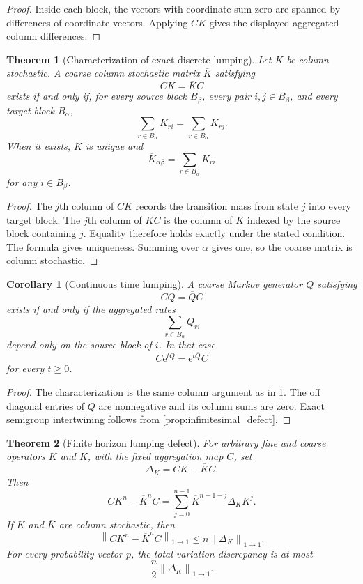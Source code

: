 \documentclass{aomart}
\newtheorem{theorem}{Theorem}[section]
\newtheorem{corollary}[corollary]{Corollary}
\theoremstyle{definition}
\theoremstyle{remark}
\newcommand{\e}{\mathrm e}
\newcommand{\norm}[1]{\left\lVert#1\right\rVert}
\begin{document}
\begin{proof}
Inside each block, the vectors with coordinate sum zero are spanned by differences of coordinate vectors. Applying \(CK\) gives the displayed aggregated column differences.
\end{proof}

\begin{theorem}[Characterization of exact discrete lumping]\label{thm:lumping_characterization}
Let \(K\) be column stochastic. A coarse column stochastic matrix \(\overline K\) satisfying
\[
CK=\overline KC
\]
exists if and only if, for every source block \(B_\beta\), every pair \(i,j\in B_\beta\), and every target block \(B_\alpha\),
\[
\sum_{r\in B_\alpha}K_{ri}
=
\sum_{r\in B_\alpha}K_{rj}.
\]
When it exists, \(\overline K\) is unique and
\[
\overline K_{\alpha\beta}
=
\sum_{r\in B_\alpha}K_{ri}
\]
for any \(i\in B_\beta\).
\end{theorem}

\begin{proof}
The \(j\)th column of \(CK\) records the transition mass from state \(j\) into every target block. The \(j\)th column of \(\overline KC\) is the column of \(\overline K\) indexed by the source block containing \(j\). Equality therefore holds exactly under the stated condition. The formula gives uniqueness. Summing over \(\alpha\) gives one, so the coarse matrix is column stochastic.
\end{proof}

\begin{corollary}[Continuous time lumping]\label{cor:continuous_lumping}
A coarse Markov generator \(\overline Q\) satisfying
\[
CQ=\overline QC
\]
exists if and only if the aggregated rates
\[
\sum_{r\in B_\alpha}Q_{ri}
\]
depend only on the source block of \(i\). In that case
\[
C\e^{tQ}=\e^{t\overline Q}C
\]
for every \(t\geq0\).
\end{corollary}

\begin{proof}
The characterization is the same column argument as in \cref{thm:lumping_characterization}. The off diagonal entries of \(\overline Q\) are nonnegative and its column sums are zero. Exact semigroup intertwining follows from \cref{prop:infinitesimal_defect}.
\end{proof}

\begin{theorem}[Finite horizon lumping defect]\label{thm:finite_horizon_lumping}
For arbitrary fine and coarse operators \(K\) and \(\overline K\), with the fixed aggregation map \(C\), set
\[
\Delta_K=CK-\overline KC.
\]
Then
\[
CK^n-\overline K^nC
=
\sum_{j=0}^{n-1}
\overline K^{n-1-j}\Delta_KK^j.
\]
If \(K\) and \(\overline K\) are column stochastic, then
\[
\norm{CK^n-\overline K^nC}_{1\to1}
\leq
n\norm{\Delta_K}_{1\to1}.
\]
For every probability vector \(p\), the total variation discrepancy is at most
\[
\frac n2\norm{\Delta_K}_{1\to1}.
\]
\end{theorem}
\end{document}
